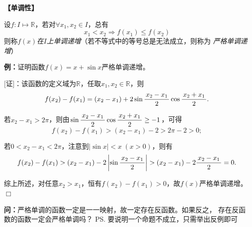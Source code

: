 {\bf 【单调性】}

设$f:I\mapsto\mathbb{R}$，若对$\forall x_1,x_2\in I$，总有
$$x_1<x_2\Rightarrow f(x_1)\leq f(x_2)$$
则称{\it $f(x)$在$I$上单调递增}（若不等式中的等号总是无法成立，则称为
{\it 严格单调递增}）
	
{\b{\bf 例：}证明函数$f(x)=x+\sin x$严格单调递增。}

\begin{center}
\end{center}

[证]：该函数的定义域为$\mathbb{R}$，任取$x_1,x_2\in\mathbb{R}$，则
$$f(x_2)-f(x_1)=(x_2-x_1)+2\sin\displaystyle\frac{\,{x_2-x_1}\,}{\,{2}\,}\cos\displaystyle\frac{\,{x_2+x_1}\,}{\,{2}\,}.$$

若$x_2-x_1>2\pi$，则由$\sin\displaystyle\frac{\,{x_2-x_1}\,}{\,{2}\,}\cos\displaystyle\frac{\,{x_2+x_1}\,}{\,{2}\,}\geq -1$，可得
$$f(x_2)-f(x_1)>(x_2-x_1)-2>2\pi-2>0;$$

若$0<x_2-x_1<2\pi$，注意到$|\sin x|<x\;(x>0)$，则有
$$f(x_2)-f(x_1)>(x_2-x_1)-2\left|\sin\displaystyle\frac{\,{x_2-x_1}\,}{\,{2}\,}\right|
>(x_2-x_1)-2\displaystyle\frac{\,{x_2-x_1}\,}{\,{2}\,}=0.$$

综上所述，对任意$x_2>x_1$，恒有$f(x_2)-f(x_1)>0$，故$f(x)$严格单调递增。
\hfill $\Box$


{\b{\bf 问：}严格单调的函数一定是一一映射，故一定存在反函数。如果反之，
存在反函数的函数一定会严格单调吗？}
\ps{要说明一个命题不成立，只需举出反例即可}

